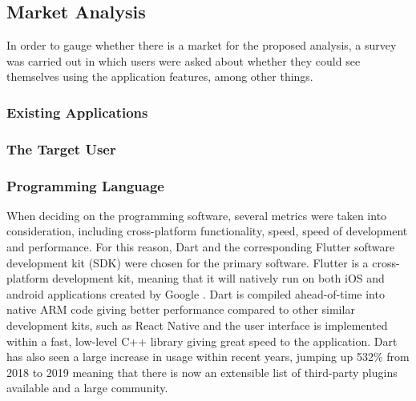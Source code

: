 \documentclass[12pt]{article}
\begin{document}
	\subsection{Market Analysis}
	In order to gauge whether there is a market for the proposed analysis, a survey was carried out in which users were asked about whether they could see themselves using the application features, among other things.
	 
	\subsubsection{Existing Applications}
	
	
	\subsubsection{The Target User}
	
	\subsubsection{Programming Language}
	When deciding on the programming software, several metrics were taken into consideration, including cross-platform functionality, speed, speed of development and performance. For this reason, Dart and the corresponding Flutter software development kit (SDK) were chosen for the primary software. Flutter is a cross-platform development kit, meaning that it will natively run on both iOS and android applications created by Google \cite{flutter}. Dart is compiled ahead-of-time into native ARM code giving better performance compared to other similar development kits, such as React Native and the user interface  is implemented within a fast, low-level C++ library giving great speed to the application. Dart has also seen a large increase in usage within recent years, jumping up 532\% from 2018 to 2019 \cite{Github, 2018} meaning that there is now an extensible list of third-party plugins available and a large community.
	
\end{document}
